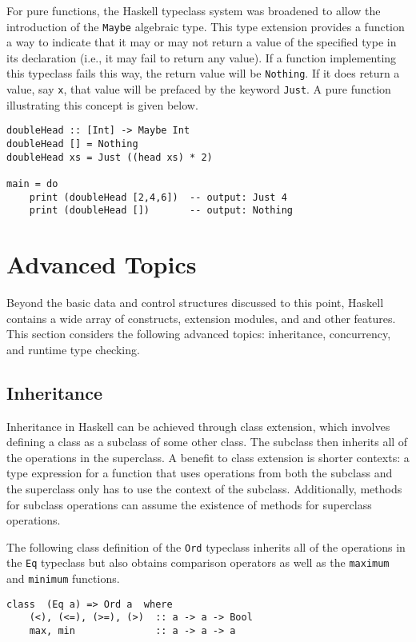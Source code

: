 \documentclass[titlepage,12pt]{article}
\begin{document}
For pure functions, the Haskell typeclass system was broadened to allow the introduction
of the \texttt{Maybe} algebraic type.  This type extension provides a function a way to
indicate that it may or may not return a value of the specified type in its declaration
(i.e., it may fail to return any value).  If a function implementing this typeclass
fails this way, the return value will be \texttt{Nothing}.  If it does return a value, say \texttt{x},
that value will be prefaced by the keyword \texttt{Just}.  A pure function illustrating this concept
is given below.
\newpage
\begin{verbatim}
doubleHead :: [Int] -> Maybe Int
doubleHead [] = Nothing
doubleHead xs = Just ((head xs) * 2)

main = do
    print (doubleHead [2,4,6])  -- output: Just 4
    print (doubleHead [])       -- output: Nothing
\end{verbatim}


\section{Advanced Topics}
Beyond the basic data and control structures discussed to this point,
Haskell contains a wide array of constructs, extension modules, and
and other features.  This section considers the following advanced
topics: inheritance, concurrency, and runtime type checking.

\subsection{Inheritance}

Inheritance in Haskell can be achieved through class extension, which involves defining a class as a subclass 
of some other class. The subclass then inherits all of the operations in the superclass. A benefit to class 
extension is shorter contexts: a type expression for a function that uses operations from both the subclass 
and the superclass only has to use the context of the subclass. Additionally, methods for subclass 
operations can assume the existence of methods for superclass operations.

The following class definition of the \texttt{Ord} typeclass inherits all of the operations in the \texttt{Eq} typeclass but
also obtains comparison operators as well as the \texttt{maximum} and \texttt{minimum} functions.

\begin{verbatim}
class  (Eq a) => Ord a  where
    (<), (<=), (>=), (>)  :: a -> a -> Bool
    max, min              :: a -> a -> a
\end{verbatim}
\end{document}
